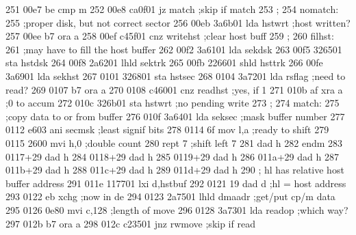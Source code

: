 251    00e7 be               cmp      m
252    00e8 ca0f01           jz       match                  ;skip if match
253                ;
254                nomatch:
255                          ;proper disk, but not correct sector
256    00eb 3a6b01           lda      hstwrt                 ;host written?
257    00ee b7               ora      a
258    00ef c45f01           cnz      writehst               ;clear host buff
259                ;
260                filhst:
261                          ;may have to fill the host buffer
262    00f2 3a6101           lda      sekdsk
263    00f5 326501           sta      hstdsk
264    00f8 2a6201           lhld     sektrk
265    00fb 226601           shld     hsttrk
266    00fe 3a6901           lda      sekhst
267    0101 326801           sta      hstsec
268    0104 3a7201           lda      rsflag                 ;need to read?
269    0107 b7               ora      a
270    0108 c46001           cnz      readhst                ;yes, if 1
271    010b af               xra      a                      ;0 to accum
272    010c 326b01           sta      hstwrt                 ;no pending write
273                          ;
274                match:
275                          ;copy data to or from buffer
276    010f 3a6401           lda      seksec                 ;mask buffer number
277    0112 e603             ani      secmsk                 ;least signif bits
278    0114 6f               mov      l,a                    ;ready to shift
279    0115 2600             mvi      h,0                    ;double count
280                          rept     7                      ;shift left 7
281                          dad      h
282                          endm
283    0117+29               dad      h
284    0118+29               dad      h
285    0119+29               dad      h
286    011a+29               dad      h
287    011b+29               dad      h
288    011c+29               dad      h
289    011d+29               dad      h
290                ;         hl has relative host buffer address
291    011e 117701           lxi      d,hstbuf
292    0121 19               dad      d                      ;hl = host address
293    0122 eb               xchg                            ;now in de
294    0123 2a7501           lhld     dmaadr                 ;get/put cp/m data
295    0126 0e80             mvi      c,128                  ;length of move
296    0128 3a7301           lda      readop                 ;which way?
297    012b b7               ora      a
298    012c c23501           jnz      rwmove                 ;skip if read
